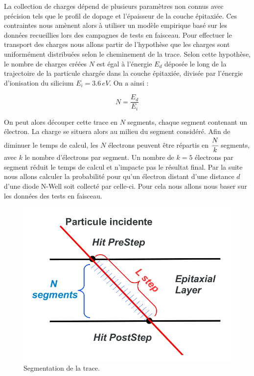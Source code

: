    \medskip
   
   La collection de charges d\'epend de plusieurs param\`etres non connus avec pr\'ecision tels que le profil de dopage et l'\'epaisseur de la couche épitaxiée. Ces contraintes nous am\`enent alors \`a utiliser un mod\`ele empirique bas\'e sur les donn\'ees recueillies lors des campagnes de tests en faisceau. Pour effectuer le transport des charges nous allons partir de l'hypoth\`ese que les charges sont uniform\'ement distribu\'ees selon le cheminement de la trace. Selon cette hypoth\`ese, le nombre de charges cr\'e\'ees $N$ est \'egal \`a l'\'energie $E_d$ d\'epos\'ee le long de la trajectoire de la particule charg\'ee dans la couche \'epitaxi\'ee, divis\'ee par l'\'energie d'ionisation du silicium $E_i = 3.6 \, eV$. On a ainsi :
   
   \begin{equation}
     N = \dfrac{E_d}{E_i}
   \end{equation}

  On peut alors d\'ecouper cette trace en $N$ segments, chaque segment contenant un \'electron. La charge se situera alors au milieu du segment consid\'er\'e. Afin de diminuer le temps de calcul, les $N$ \'electrons peuvent \^etre r\'epartis en $\cfrac{N}{k}$ segments, avec $k$ le nombre d'\'electrons par segment. Un nombre de $k=5$ \'electrons par segment r\'eduit le temps de calcul et n'impacte pas le r\'esultat final. Par la suite nous allons calculer la probabilit\'e pour qu'un \'electron distant d'une distance $d$ d'une diode N-Well soit collect\'e par celle-ci. Pour cela nous allons nous baser sur les donn\'ees des tests en faisceau.
 
   \begin{figure}[!htb]
    \begin{center} 
     \includegraphics[scale=0.30]{./figures/segments.png}
     \caption{Segmentation de la trace.}
    \end{center}
    \label{fig:segments}
   \end{figure} 
   

